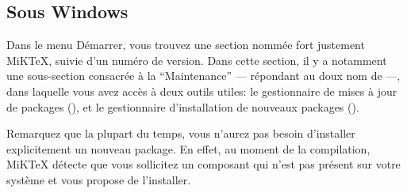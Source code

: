 \subsection{Sous Windows}

Dans le menu Démarrer, vous trouvez une section nommée fort justement MiKTeX, suivie d'un numéro de version. Dans cette section, il y a notamment une sous-section consacrée à la \enquote{Maintenance} --- répondant au doux nom de  ---, dans laquelle vous avez accès à deux outils utiles: le gestionnaire de mises à jour de packages (), et le gestionnaire d'installation de nouveaux packages ().

Remarquez que la plupart du temps, vous n'aurez pas besoin d'installer explicitement un nouveau package. En effet, au moment de la compilation, MiKTeX détecte que vous sollicitez un composant qui n'est pas présent sur votre système et vous propose de l'installer.
